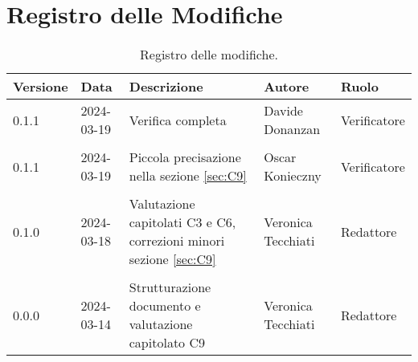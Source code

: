 \section*{Registro delle Modifiche}
\begin{table}[ht!]	
		\centering
		\begin{tabular}{p{1.2cm} p{2cm} p{6cm} p{3cm} p{2cm}}
			\toprule
			\textbf{Versione}& \textbf{Data} & \textbf{Descrizione} & \textbf{Autore} & \textbf{Ruolo} \\
			\midrule
				0.1.1 & 2024-03-19 & Verifica completa & Davide Donanzan & Verificatore
				\\\\
				0.1.1 & 2024-03-19 & Piccola precisazione nella sezione \ref{sec:C9} & Oscar Konieczny & Verificatore
				\\\\ %
                0.1.0 & 2024-03-18 & Valutazione capitolati C3 e C6, correzioni minori sezione \ref{sec:C9} & Veronica Tecchiati & Redattore 
   				\\\\ %
				0.0.0 & 2024-03-14 & Strutturazione documento e valutazione capitolato C9 & Veronica Tecchiati & Redattore \\
			\bottomrule
		\end{tabular}
		\caption{Registro delle modifiche.}
		\label{table:Registro delle modifiche}
\end{table}